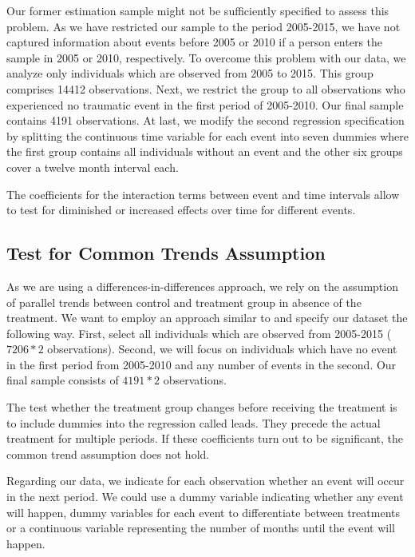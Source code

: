 \documentclass[12pt, a4paper, fleqn, parskip]{scrartcl}
\begin{document}
Our former estimation sample might not be sufficiently specified to assess this problem.
As we have restricted our sample to the period 2005-2015, we have not captured
information about events before 2005 or 2010 if a person enters the sample in 2005 or
2010, respectively. To overcome this problem with our data, we analyze only individuals
which are observed from 2005 to 2015. This group comprises 14412 observations. Next, we
restrict the group to all observations who experienced no traumatic event in the first
period of 2005-2010. Our final sample contains 4191 observations. At last, we modify the
second regression specification by splitting the continuous time variable for each event
into seven dummies where the first group contains all individuals without an event and
the other six groups cover a twelve month interval each.

The coefficients for the interaction terms between event and time intervals allow to
test for diminished or increased effects over time for different events.


\subsection{Test for Common Trends Assumption} %
\label{sub:test_for_common_trends_assumption}

As we are using a differences-in-differences approach, we rely on the assumption of
parallel trends between control and treatment group in absence of the treatment. We want
to employ an approach similar to \citet{autor2003} and specify our dataset the following
way. First, select all individuals which are observed from 2005-2015 ($7206 * 2$
observations). Second, we will focus on individuals which have no event in the first
period from 2005-2010 and any number of events in the second. Our final sample consists
of $4191 * 2$ observations.

The test whether the treatment group changes before receiving the treatment is to
include dummies into the regression called leads. They precede the actual treatment for
multiple periods. If these coefficients turn out to be significant, the common trend
assumption does not hold.

Regarding our data, we indicate for each observation whether an event will occur in the
next period. We could use a dummy variable indicating whether any event will happen,
dummy variables for each event to differentiate between treatments or a continuous
variable representing the number of months until the event will happen.
\end{document}
